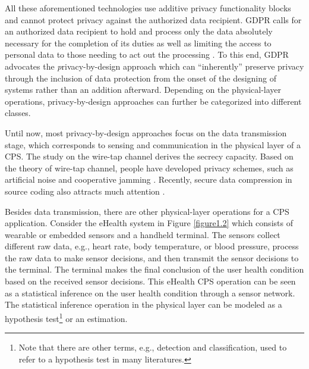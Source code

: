 All these aforementioned technologies use additive privacy functionality blocks and cannot protect privacy against the authorized data recipient. GDPR calls for an authorized data recipient to hold and process only the data absolutely necessary for the completion of its duties as well as limiting the access to personal data to those needing to act out the processing \cite{gdpr}. To this end, GDPR advocates the {\textit privacy-by-design} approach which can ``inherently'' preserve privacy through the inclusion of data protection from the onset of the designing of systems rather than an addition afterward. Depending on the physical-layer operations, privacy-by-design approaches can further be categorized into different classes.

Until now, most privacy-by-design approaches focus on the data transmission stage, which corresponds to sensing and communication in the physical layer of a CPS. The study on the wire-tap channel \cite{wyner1975} derives the secrecy capacity. Based on the theory of wire-tap channel, people have developed privacy schemes, such as artificial noise \cite{goel2008} and cooperative jamming \cite{tekin2007}. Recently, secure data compression in source coding also attracts much attention \cite{kitti2011}.


Besides data transmission, there are other physical-layer operations for a CPS application. Consider the eHealth system in Figure \ref{figure1.2} which consists of wearable or embedded sensors and a handheld terminal. The sensors collect different raw data, e.g., heart rate, body temperature, or blood pressure, process the raw data to make sensor decisions, and then transmit the sensor decisions to the terminal. The terminal makes the final conclusion of the user health condition based on the received sensor decisions. This eHealth CPS operation can be seen as a statistical inference on the user health condition through a sensor network. The statistical inference operation in the physical layer can be modeled as a { hypothesis test}\footnote{Note that there are other terms, e.g., { detection} and { classification}, used to refer to a hypothesis test in many literatures.} or an estimation.

